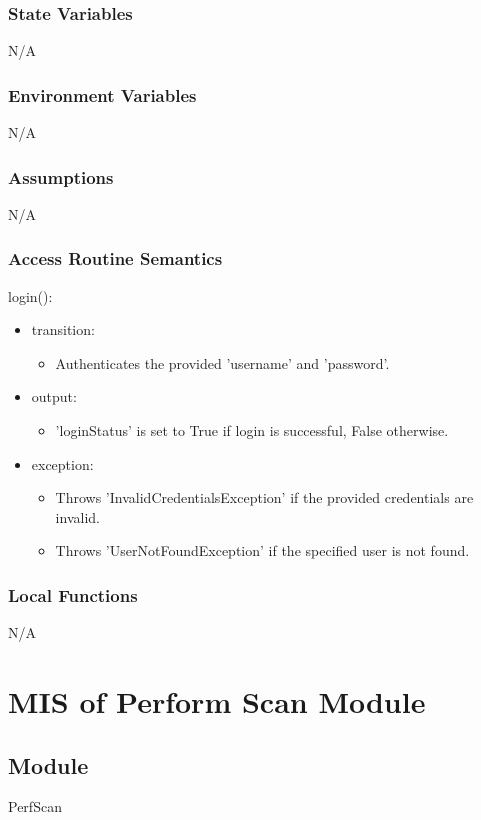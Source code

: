 \documentclass[12pt, titlepage]{article}
\begin{document}
\subsubsection{State Variables}
N/A
\subsubsection{Environment Variables}
N/A
\subsubsection{Assumptions}
N/A
\subsubsection{Access Routine Semantics}

\noindent login():
\begin{itemize}
\item transition: \begin{itemize}
    \item Authenticates the provided 'username' and 'password'.
\end{itemize}
\item output: \begin{itemize}
    \item 'loginStatus' is set to True if login is successful, False otherwise.
\end{itemize}
\item exception: \begin{itemize}
    \item Throws 'InvalidCredentialsException' if the provided credentials are invalid.
    \item Throws 'UserNotFoundException' if the specified user is not found.
\end{itemize}
\end{itemize}

\subsubsection{Local Functions}
N/A
\newpage

\section{MIS of Perform Scan Module} \label{Module} 
\subsection{Module}
PerfScan
\end{document}
